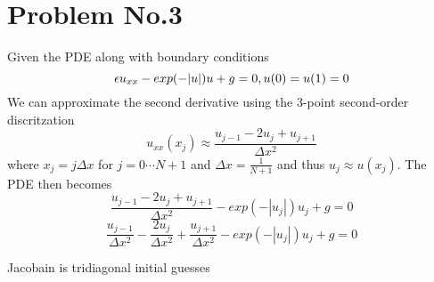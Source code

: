 \section*{Problem No.3} \label{sec:prob3}
Given the PDE along with boundary conditions 
\[
\epsilon u_{xx}-exp(-|u|)u+g =0,\\
u(0)=u(1)=0
\]
We can approximate the second derivative using the 3-point second-order discritzation 
\[
u_{xx}(x_{j}) \approx \frac{u_{j-1}-2u_{j}+u_{j+1}}{\Delta x^{2}}
\]
where $x_{j}=j\Delta x$ for $j=0 \cdots N+1$ and $\Delta x = \frac{1}{N+1}$ and thus $u_{j}\approx u(x_{j})$. The PDE then becomes 
\[
\frac{u_{j-1}-2u_{j}+u_{j+1}}{\Delta x^{2}} - exp(-|u_{j}|)u_{j}+g=0
\]
\[
\frac{ u_{j-1}}{\Delta x^{2}}-\frac{2u_{j}}{\Delta x^{2}} + \frac{ u_{j+1}}{\Delta x^{2}} -exp(-|u_{j}|)u_{j}+g=0
\]

Jacobain is tridiagonal 
initial guesses 